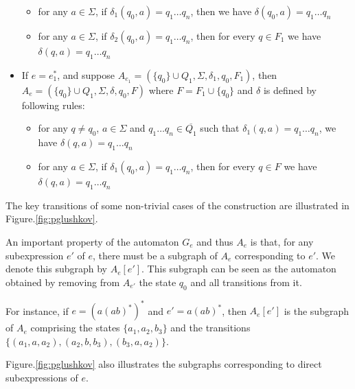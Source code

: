 \begin{itemize}
\begin{itemize}
    \item for any $a \in \Sigma$, if $\delta_1 (q_0, a) = q_1 \ldots q_n$,
    then we have $\delta (q_0, a) = q_1 \ldots q_n$
    
    \item for any $a \in \Sigma$, if $\delta_2 (q_0, a) = q_1 \ldots q_n$,
    then for every $q \in F_1$ we have $\delta (q, a) = q_1 \ldots q_n$
  \end{itemize}
  \item If $e = e_1^{\ast}$, and suppose $A_{e_1} = (\{ q_0 \} \cup Q_1,
  \Sigma, \delta_1, q_0, F_1)$, then $A_e = (\{ q_0 \} \cup Q_1, \Sigma,
  \delta, q_0, F)$ where $F = F_1 \cup \{ q_0 \}$ and $\delta$ is defined by
  following rules:
  \begin{itemize}
    \item for any $q \neq q_0$, $a \in \Sigma$ and $q_1 \ldots q_n \in
    \overline{Q_1}$ such that $\delta_1 (q, a) = q_1 \ldots q_n$, we have
    $\delta (q, a) = q_1 \ldots q_n$
    
    \item for any $a \in \Sigma$, if $\delta_1 (q_0, a) = q_1 \ldots q_n$,
    then for every $q \in F$ we have $\delta (q, a) = q_1 \ldots q_n$
  \end{itemize}
\end{itemize}

The key transitions of some non-trivial cases of the construction are illustrated in Figure.\ref{fig:pglushkov}.

 An important property of the automaton $G_e$ and thus $A_e$ is that, for any subexpression $e'$ of $e$, there must be a subgraph of $A_{e}$ corresponding to $e'$. We denote this subgraph by $A_{e}[e']$. This subgraph can be seen as the automaton obtained by removing from $A_{e'}$ the state $q_0$ and all transitions from it.
 
 For instance, if $e = (a (ab)^*)^*$ and $e' = a(ab)^*$, then $A_{e}[e']$ is the subgraph of $A_{e}$ comprising the states $\{a_1, a_2, b_3\}$ and the transitions $\{(a_1, a, a_2), (a_2, b, b_3), (b_3, a, a_2)\}$.
 
 Figure.\ref{fig:pglushkov} also illustrates the subgraphs corresponding to direct subexpressions of $e$.
 


